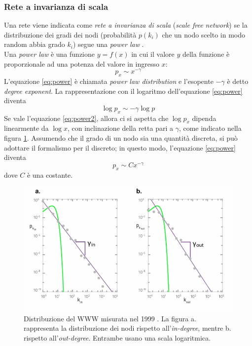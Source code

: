 \documentclass[a4paper,12pt]{article}
\begin{document}
\subsubsection{Rete a invarianza di scala}
Una rete viene indicata come \textit{rete a invarianza di scala} (\textit{scale free network}) se la distribuzione dei gradi dei nodi (probabilità $p(k_i)$ che un nodo scelto in modo random abbia grado $k_i$) segue una \textit{power law} \cite{scalefree}.\\
Una \textit{power law} \cite{barabasi} è una funzione $y=f(x)$ in cui il valore $y$ della funzione è proporzionale ad una potenza del valore in ingresso $x$:
\begin{equation}
\label{eq:power}
p_x \sim x^{-\gamma}
\end{equation}
L'equazione \ref{eq:power} è chiamata \textit{power law distribution} e l'esopente $-\gamma$ è detto \textit{degree exponent}. La rappresentazione con il logaritmo dell'equazione \ref{eq:power} diventa
\begin{equation}
\label{eq:power2}
\log p_x \sim -\gamma \log p
\end{equation}
Se vale l'equazione \ref{eq:power2}, allora ci si aspetta che $\log p_x$ dipenda linearmente da $\log x$, con inclinazione della retta pari a $\gamma$, come indicato nella figura \ref{fig:power}. Assumendo che il grado di un nodo sia una quantità discreta, si può adottare il formalismo per il discreto; in questo modo, l'equazione \ref{eq:power} diventa
\begin{equation}
p_x \sim Cx^{-\gamma}
\end{equation} 
dove $C$ è una costante.
\begin{figure}[h]
\centering
\includegraphics[scale=0.6]{images/powerlaw.png}
\caption{Distribuzione del WWW misurata nel 1999 \cite{barabasi}. La figura a. rappresenta la distribuzione dei nodi rispetto all'\textit{in-degree}, mentre b. rispetto all'\textit{out-degree}. Entrambe usano una scala logaritmica.}
\label{fig:power}
\end{figure}
\end{document}
